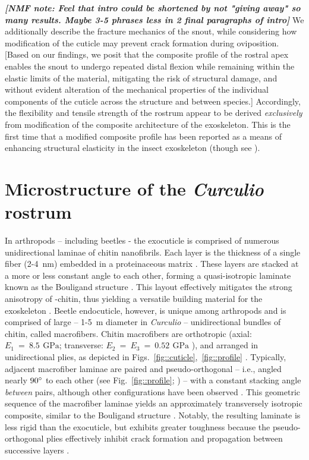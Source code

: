 \documentclass[twocolumn, linenumbers, superscriptaddress, nofootinbib]{revtex4-1}
\begin{document}
	\textit{\textbf{[NMF note: Feel that intro could be shortened by not "giving away" so many results. Maybe 3-5 phrases less in 2 final paragraphs of intro]}}
	We additionally describe the fracture mechanics of the snout, while considering how modification of the cuticle may prevent crack formation during oviposition.
	[Based on our findings, we posit that the composite profile of the rostral apex enables the snout to undergo repeated distal flexion while remaining within the elastic limits of the material, mitigating the risk of structural damage, and without evident alteration of the mechanical properties of the individual components of the cuticle across the structure and between species.]
	Accordingly, the flexibility and tensile strength of the rostrum appear to be derived \emph{exclusively} from modification of the composite architecture of the exoskeleton.
	This is the first time that a modified composite profile has been reported as a means of enhancing structural elasticity in the insect exoskeleton (though see \cite{Matsumura2017}).
	
	\section{Microstructure of the \textit{Curculio} rostrum}
		In arthropods -- including beetles - the exocuticle is comprised of numerous unidirectional laminae of chitin nanofibrils.
		Each layer is the thickness of a single fiber (2-4 \,nm) embedded in a proteinaceous matrix \cite{Nikolov2010, Nikolov2011}.
		These layers are stacked at a more or less constant angle to each other, forming a quasi-isotropic laminate known as the Bouligand structure \cite{Blackwell1980, Bouligand1972, Neville1976}. 
		This layout effectively mitigates the strong anisotropy of \textalpha-chitin, thus yielding a versatile building material for the exoskeleton \cite{Vincent1982, Vincent2004, Nikolov2010, Nikolov2011}.		
		Beetle endocuticle, however, is unique among arthropods and is comprised of large -- 1-5 \,{\textmu}m diameter in \textit{Curculio} -- unidirectional bundles of chitin, called macrofibers.
		Chitin macrofibers are orthotropic (axial: $E_1~=~8.5~\,\text{GPa}$; transverse: $ E_2~=~E_3~=~0.52~\,\text{GPa}$ \cite{Jansen2016}), and arranged in unidirectional plies, as depicted in Figs.~\ref{fig::cuticle},~\ref{fig::profile} \cite{Kamp2010, Kamp2015}.
		Typically, adjacent macrofiber laminae are paired and pseudo-orthogonal -- i.e., angled nearly $90\degree$ to each other (see Fig.~\ref{fig::profile}; \cite{Cheng2009}) -- with a constant stacking angle \emph{between} pairs, although other configurations have been observed \cite{Hepburn1973, Kamp2010, Kamp2015, Leopold1992}.
		This geometric sequence of the macrofiber laminae yields an approximately transversely isotropic composite, similar to the Bouligand structure \cite{Kamp2015, Nikolov2010}.
		Notably, the resulting laminate is less rigid than the exocuticle, but exhibits greater toughness because the pseudo-orthogonal plies effectively inhibit crack formation and propagation between successive layers \cite{Kamp2010, Kamp2015, Hepburn1973}.
		
\end{document}
